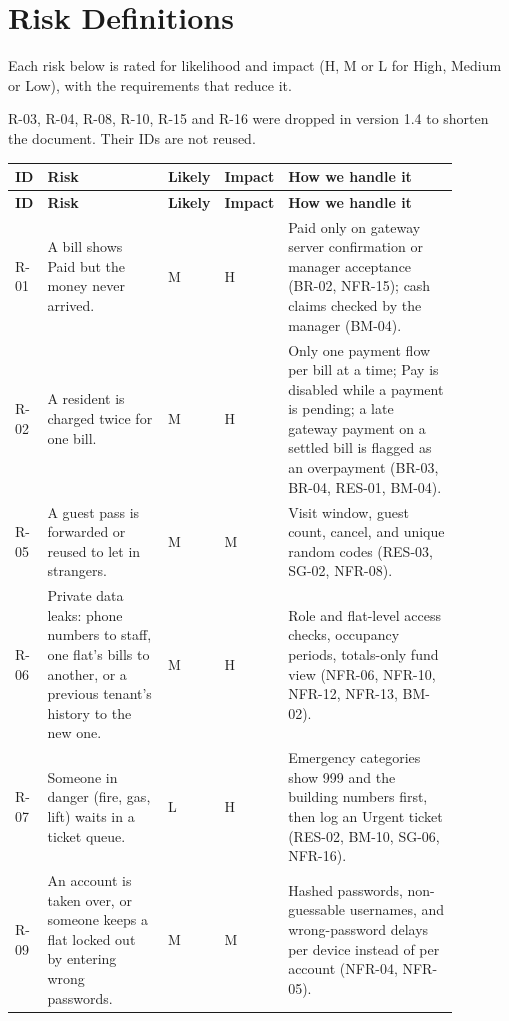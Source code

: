 \documentclass[11pt,a4paper]{report}
\begin{document}
\section{Risk Definitions}

Each risk below is rated for likelihood and impact (H, M or L for High, Medium or Low), with the requirements that reduce it.

R-03, R-04, R-08, R-10, R-15 and R-16 were dropped in version 1.4 to shorten the document. Their IDs are not reused.

{\small\setlength{\LTpre}{6pt}\setlength{\LTpost}{6pt}
\begin{longtable}{>{\raggedright\arraybackslash}p{0.050\linewidth}>{\raggedright\arraybackslash}p{0.286\linewidth}>{\raggedright\arraybackslash}p{0.069\linewidth}>{\raggedright\arraybackslash}p{0.069\linewidth}>{\raggedright\arraybackslash}p{0.401\linewidth}}
\toprule
\textbf{ID} & \textbf{Risk} & \textbf{Likely} & \textbf{Impact} & \textbf{How we handle it} \\
\midrule
\endfirsthead
\toprule
\textbf{ID} & \textbf{Risk} & \textbf{Likely} & \textbf{Impact} & \textbf{How we handle it} \\
\midrule
\endhead
\bottomrule
\endlastfoot
R-01 & A bill shows Paid but the money never arrived. & M & H & Paid only on gateway server confirmation or manager acceptance (BR-02, NFR-15); cash claims checked by the manager (BM-04). \\
R-02 & A resident is charged twice for one bill. & M & H & Only one payment flow per bill at a time; Pay is disabled while a payment is pending; a late gateway payment on a settled bill is flagged as an overpayment (BR-03, BR-04, RES-01, BM-04). \\
R-05 & A guest pass is forwarded or reused to let in strangers. & M & M & Visit window, guest count, cancel, and unique random codes (RES-03, SG-02, NFR-08). \\
R-06 & Private data leaks: phone numbers to staff, one flat's bills to another, or a previous tenant's history to the new one. & M & H & Role and flat-level access checks, occupancy periods, totals-only fund view (NFR-06, NFR-10, NFR-12, NFR-13, BM-02). \\
R-07 & Someone in danger (fire, gas, lift) waits in a ticket queue. & L & H & Emergency categories show 999 and the building numbers first, then log an Urgent ticket (RES-02, BM-10, SG-06, NFR-16). \\
R-09 & An account is taken over, or someone keeps a flat locked out by entering wrong passwords. & M & M & Hashed passwords, non-guessable usernames, and wrong-password delays per device instead of per account (NFR-04, NFR-05). \\

\end{longtable}}
\end{document}
